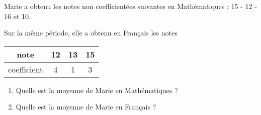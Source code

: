 
Marie a obtenu les notes non coefficientées suivantes en Mathématiques : 15 - 12 - 16 et 10. 

Sur la même période, elle a obtenu en Français les notes 

\begin{minipage}{0.48\linewidth}
\begin{tabular}{|c|c|c|c|}
\hline 
note & 12 & 13 & 15 \\ 
\hline 
coefficient & 4 & 1 & 3 \\ 
\hline 
\end{tabular} 
\end{minipage}
\hfill
\begin{minipage}{0.48\linewidth}
\begin{enumerate}
\item Quelle est la moyenne de Marie en Mathématiques ?
\item Quelle est la moyenne de Marie en Français ?
\end{enumerate}
\end{minipage}